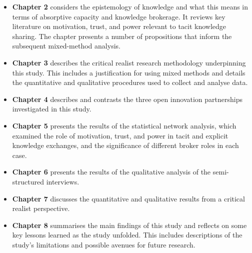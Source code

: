 \begin{itemize}[leftmargin=0pt]
\item[] \textbf{Chapter 2} considers the epistemology of knowledge and what this means in terms of absorptive capacity and knowledge brokerage. It reviews key literature on motivation, trust, and power relevant to tacit knowledge sharing. The chapter presents a number of propositions that inform the subsequent mixed-method analysis. 
\item[] \textbf{Chapter 3} describes the critical realist research methodology underpinning this study. This includes a justification for using mixed methods and details the quantitative and qualitative procedures used to collect and analyse data.
\item[] \textbf{Chapter 4} describes and contrasts the three open innovation partnerships investigated in this study.
\item[] \textbf{Chapter 5} presents the results of the statistical network analysis, which examined the role of motivation, trust, and power in tacit and explicit knowledge exchanges, and the significance of different broker roles in each case.
\item[] \textbf{Chapter 6} presents the results of the qualitative analysis of the semi-structured interviews.
\item[] \textbf{Chapter 7} discusses the quantitative and qualitative results from a critical realist perspective. 
\item[] \textbf{Chapter 8} summarises the main findings of this study and reflects on some key lessons learned as the study unfolded. This includes descriptions of the study's limitations and possible avenues for future research. 
\end{itemize}